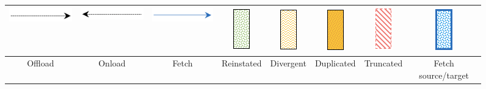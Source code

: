 \documentclass{article}
\begin{document}
\begin{figure}[h!]
	\centering
	\renewcommand{\arraystretch}{2} %
	\begin{tabular}{|c|c|c|c|c|c|c|c|}
		\hline
		 \includegraphics[scale=0.4]{img/offload.png}  & \includegraphics[scale=0.4]{img/onload.png} & \includegraphics[scale=0.4]{img/fetch.png} &  \includegraphics[scale=0.4]{img/restored.png} & \includegraphics[scale=0.4]{img/divergent.png} & \includegraphics[scale=0.4]{img/duplicated.png} & \includegraphics[scale=0.4]{img/truncated.png} &  \includegraphics[scale=0.4]{img/fetch record.png} \\
		 \hline
		Offload & Onload & Fetch & Reinstated & Divergent & Duplicated & Truncated & Fetch source/target \\
		\hline
	\end{tabular}
\end{figure}
\end{document}
